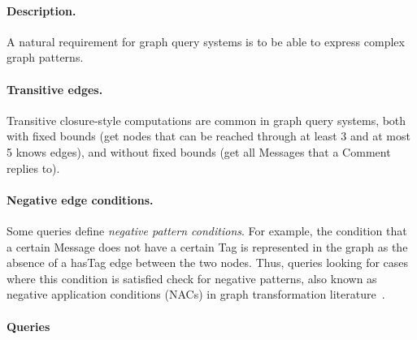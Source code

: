 
\paragraph{Description.}

A natural requirement for graph query systems is to be able to express complex
graph patterns.

\paragraph{Transitive edges.} Transitive closure-style computations are common in graph query systems, both with fixed bounds
(\eg get nodes that can be reached through at least 3 and at most 5 \textsf{knows} edges),
and without fixed bounds
(\eg get all \textsf{Messages} that a \textsf{Comment} replies to).

\paragraph{Negative edge conditions.} Some queries define \emph{negative pattern conditions}. For example, the condition that a certain \textsf{Message} does not have a certain \textsf{Tag} is represented in the graph as the absence of a \textsf{hasTag} edge between the two nodes. Thus, queries looking for cases where this condition is satisfied check for negative patterns, also known as negative application conditions (NACs) in graph transformation literature~\cite{DBLP:journals/fuin/HabelHT96}.


\paragraph{Queries}
{\raggedright

}